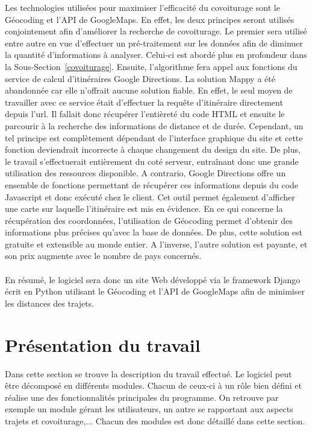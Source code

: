 \documentclass[12pt, a4paper, oneside]{article}
\begin{document}
    \indent Les technologies utilisées pour maximiser l'efficacité du covoiturage sont le Géocoding et l'API de GoogleMaps. En effet, les deux principes seront utilisés conjointement afin d'améliorer la recherche de covoiturage. Le premier sera utilisé entre autre en vue d'effectuer un pré-traitement sur les données afin de diminuer la quantité d'informations à analyser. Celui-ci est abordé plus en profondeur dans la Sous-Section~\ref{covoiturage}. Ensuite, l'algorithme fera appel aux fonctions du service de calcul d'itinéraires Google Directions. La solution Mappy a été abandonnée car elle n'offrait aucune solution fiable. En effet, le seul moyen de travailler avec ce service était d'effectuer la requête d'itinéraire directement depuis l'url. Il fallait donc récupérer l'entièreté du code HTML et ensuite le parcourir à la recherche des informations de distance et de durée. Cependant, un tel principe est complètement dépendant de l'interface graphique du site et cette fonction deviendrait incorrecte à chaque changement du design du site. De plus, le travail s'effectuerait entièrement du coté serveur, entraînant donc une grande utilisation des ressources disponible. A contrario, Google Directions offre un ensemble de fonctions permettant de récupérer ces informations depuis du code Javascript et donc exécuté chez le client. Cet outil permet également d'afficher une carte sur laquelle l'itinéraire est mis en évidence. En ce qui concerne la récupération des coordonnées, l'utilisation de Géocoding permet d'obtenir des informations plus précises qu'avec la base de données. De plus, cette solution est gratuite et extensible au monde entier. A l'inverse, l'autre solution est payante, et son prix augmente avec le nombre de pays concernés.\\\\
    \indent En résumé, le logiciel sera donc un site Web développé via le framework Django écrit en Python utilisant le Géocoding et l'API de GoogleMaps afin de minimiser les distances des trajets.
\section{Présentation du travail}
    Dans cette section se trouve la description du travail effectué. Le logiciel peut être décomposé en différents modules. Chacun de ceux-ci à un rôle bien défini et réalise une des fonctionnalités principales du programme.  On retrouve par exemple un module gérant les utilisateurs, un autre se rapportant aux aspects trajets et covoiturage,... Chacun des modules est donc détaillé dans cette section.
\end{document}
